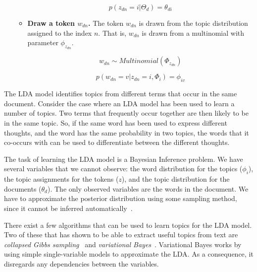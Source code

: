 \begin{itemize}
\begin{itemize}
                \begin{equation}
                    p(z_{dn} = i | \Theta_d) = \theta_{di}
                \end{equation}

            \item \textbf{Draw a token $w_{dn}$.}
                The token $w_{dn}$ is drawn from the topic distribution assigned to the index $n$.
                That is, $w_{dn}$ is drawn from a multinomial with parameter $\phi_{z_{dn}}$.

                \begin{equation}
                    w_{dn} \sim Multinomial(\Phi_{z_{dn}})
                \end{equation}

                \begin{equation}
                    p(w_{dn}=v|z_{dn}=i,\Phi_i) = \phi_{iv}
                \end{equation}

        \end{itemize}

\end{itemize}

The LDA model identifies topics from different terms that occur in the same document.
Consider the case where an LDA model has been used to learn a number of topics.
Two terms that frequently occur together are then likely to be in the same topic.
So, if the same word has been used to express different thoughts, and the word has the same probability in two topics, the words that it co-occurs with can be used to differentiate between the different thoughts.

The task of learning the LDA model is a Bayesian Inference problem.
We have several variables that we cannot observe: the word distribution for the topics ($\phi_i$), the topic assignments for the tokens ($z$), and the topic distribution for the documents ($\theta_d$).
The only observed variables are the words in the document.
We have to approximate the posterior distribution using some sampling method, since it cannot be inferred automatically~\cite{blei2003latent}.

There exist a few algorithms that can be used to learn topics for the LDA model. 
Two of these that has shown to be able to extract useful topics from text are \textit{collapsed Gibbs sampling}~\cite{griffiths2004finding} and \textit{variational Bayes}~\cite{blei2003latent}.  
Variational Bayes works by using simple single-variable models to approximate the LDA\@. 
As a consequence, it disregards any dependencies between the variables.

